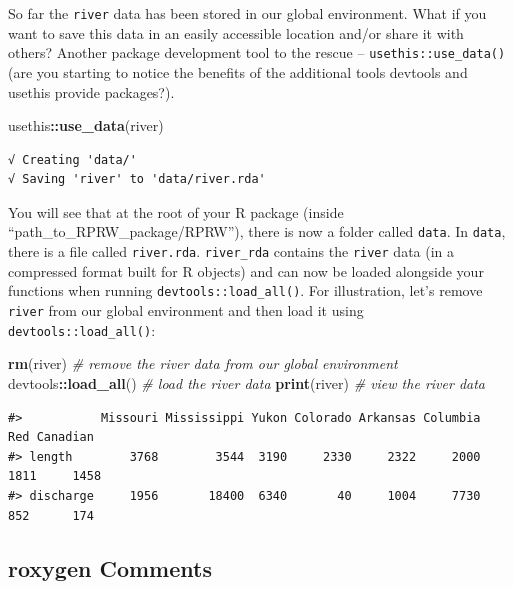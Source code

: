 \documentclass[
]{book}
\newenvironment{Shaded}{\begin{snugshade}}{\end{snugshade}}
\newcommand{\CommentTok}[1]{\textcolor[rgb]{0.56,0.35,0.01}{\textit{#1}}}
\newcommand{\KeywordTok}[1]{\textcolor[rgb]{0.13,0.29,0.53}{\textbf{#1}}}
\newcommand{\NormalTok}[1]{#1}
\newcommand{\OperatorTok}[1]{\textcolor[rgb]{0.81,0.36,0.00}{\textbf{#1}}}
\begin{document}
So far the \texttt{river} data has been stored in our global environment. What if you want to save this data in an easily accessible location and/or share it with others? Another package development tool to the rescue -- \texttt{usethis::use\_data()} (are you starting to notice the benefits of the additional tools devtools and usethis provide packages?).

\begin{Shaded}
\begin{Highlighting}[]
\NormalTok{usethis}\OperatorTok{::}\KeywordTok{use_data}\NormalTok{(river)}
\end{Highlighting}
\end{Shaded}

\begin{verbatim}
√ Creating 'data/'
√ Saving 'river' to 'data/river.rda'
\end{verbatim}

You will see that at the root of your R package (inside ``path\_to\_RPRW\_package/RPRW''), there is now a folder called \texttt{data}. In \texttt{data}, there is a file called \texttt{river.rda}. \texttt{river\_rda} contains the \texttt{river} data (in a compressed format built for R objects) and can now be loaded alongside your functions when running \texttt{devtools::load\_all()}. For illustration, let's remove \texttt{river} from our global environment and then load it using \texttt{devtools::load\_all()}:

\begin{Shaded}
\begin{Highlighting}[]
\KeywordTok{rm}\NormalTok{(river) }\CommentTok{# remove the river data from our global environment}
\NormalTok{devtools}\OperatorTok{::}\KeywordTok{load_all}\NormalTok{() }\CommentTok{# load the river data}
\KeywordTok{print}\NormalTok{(river) }\CommentTok{# view the river data}
\end{Highlighting}
\end{Shaded}

\begin{verbatim}
#>           Missouri Mississippi Yukon Colorado Arkansas Columbia  Red Canadian
#> length        3768        3544  3190     2330     2322     2000 1811     1458
#> discharge     1956       18400  6340       40     1004     7730  852      174
\end{verbatim}

\hypertarget{roxygen}{%
\subsection{roxygen Comments}\label{roxygen}}
\end{document}
